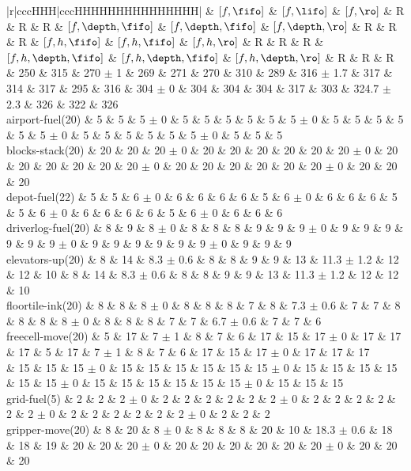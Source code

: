\begin{center}
\begin{tabular}{|r|cccHHH|cccHHHHHHHHHHHHHHH|}
 & $[f,\fifo]$ & $[f,\lifo]$ & $[f,\ro]$ & R & R & R & $[f,\depth,\fifo]$ & $[f,\depth,\fifo]$ & $[f,\depth,\ro]$ & R & R & R & $[f,h,\fifo]$ & $[f,h,\fifo]$ & $[f,h,\ro]$ & R & R & R & $[f,h,\depth,\fifo]$ & $[f,h,\depth,\fifo]$ & $[f,h,\depth,\ro]$ & R & R & R\\
\hline
 & 250 & 315 & 270 $\pm$ 1 & 269 & 271 & 270 & 310 & 289 & 316 $\pm$ 1.7 & 317 & 314 & 317 & 295 & 316 & 304 $\pm$ 0 & 304 & 304 & 304 & 317 & 303 & 324.7 $\pm$ 2.3 & 326 & 322 & 326\\
\hline
airport-fuel(20) & 5 & 5 & 5 $\pm$ 0 & 5 & 5 & 5 & 5 & 5 & 5 $\pm$ 0 & 5 & 5 & 5 & 5 & 5 & 5 $\pm$ 0 & 5 & 5 & 5 & 5 & 5 & 5 $\pm$ 0 & 5 & 5 & 5\\
blocks-stack(20) & 20 & 20 & 20 $\pm$ 0 & 20 & 20 & 20 & 20 & 20 & 20 $\pm$ 0 & 20 & 20 & 20 & 20 & 20 & 20 $\pm$ 0 & 20 & 20 & 20 & 20 & 20 & 20 $\pm$ 0 & 20 & 20 & 20\\
depot-fuel(22) & 5 & 5 & 6 $\pm$ 0 & 6 & 6 & 6 & 6 & 5 & 6 $\pm$ 0 & 6 & 6 & 6 & 5 & 5 & 6 $\pm$ 0 & 6 & 6 & 6 & 6 & 5 & 6 $\pm$ 0 & 6 & 6 & 6\\
driverlog-fuel(20) & 8 & 9 & 8 $\pm$ 0 & 8 & 8 & 8 & 9 & 9 & 9 $\pm$ 0 & 9 & 9 & 9 & 9 & 9 & 9 $\pm$ 0 & 9 & 9 & 9 & 9 & 9 & 9 $\pm$ 0 & 9 & 9 & 9\\
elevators-up(20) & 8 & 14 & 8.3 $\pm$ 0.6 & 8 & 8 & 9 & 9 & 13 & 11.3 $\pm$ 1.2 & 12 & 12 & 10 & 8 & 14 & 8.3 $\pm$ 0.6 & 8 & 8 & 9 & 9 & 13 & 11.3 $\pm$ 1.2 & 12 & 12 & 10\\
floortile-ink(20) & 8 & 8 & 8 $\pm$ 0 & 8 & 8 & 8 & 7 & 8 & 7.3 $\pm$ 0.6 & 7 & 7 & 8 & 8 & 8 & 8 $\pm$ 0 & 8 & 8 & 8 & 7 & 7 & 6.7 $\pm$ 0.6 & 7 & 7 & 6\\
freecell-move(20) & 5 & 17 & 7 $\pm$ 1 & 8 & 7 & 6 & 17 & 15 & 17 $\pm$ 0 & 17 & 17 & 17 & 5 & 17 & 7 $\pm$ 1 & 8 & 7 & 6 & 17 & 15 & 17 $\pm$ 0 & 17 & 17 & 17\\
 & 15 & 15 & 15 $\pm$ 0 & 15 & 15 & 15 & 15 & 15 & 15 $\pm$ 0 & 15 & 15 & 15 & 15 & 15 & 15 $\pm$ 0 & 15 & 15 & 15 & 15 & 15 & 15 $\pm$ 0 & 15 & 15 & 15\\
grid-fuel(5) & 2 & 2 & 2 $\pm$ 0 & 2 & 2 & 2 & 2 & 2 & 2 $\pm$ 0 & 2 & 2 & 2 & 2 & 2 & 2 $\pm$ 0 & 2 & 2 & 2 & 2 & 2 & 2 $\pm$ 0 & 2 & 2 & 2\\
gripper-move(20) & 8 & 20 & 8 $\pm$ 0 & 8 & 8 & 8 & 20 & 10 & 18.3 $\pm$ 0.6 & 18 & 18 & 19 & 20 & 20 & 20 $\pm$ 0 & 20 & 20 & 20 & 20 & 20 & 20 $\pm$ 0 & 20 & 20 & 20\\

\end{tabular}
\end{center}
